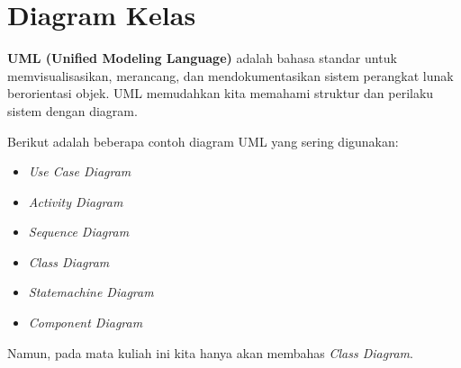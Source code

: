 \documentclass{../praktikum-ppt}
\begin{document}
    \section{Diagram Kelas}
    \begin{frame}{\insertsection}
      \begin{definisi}
        \textbf{UML (Unified Modeling Language)} adalah bahasa standar untuk memvisualisasikan, merancang, dan mendokumentasikan sistem perangkat lunak berorientasi objek. UML memudahkan kita memahami struktur dan perilaku sistem dengan diagram.
      \end{definisi}
      Berikut adalah beberapa contoh diagram UML yang sering digunakan:
      \begin{multicols}{3}
        \begin{itemize}
          \item \textit{Use Case Diagram}
          \item \textit{Activity Diagram}
          \item \textit{Sequence Diagram}
          \item \textit{Class Diagram}
          \item \textit{Statemachine Diagram}
          \item \textit{Component Diagram}
        \end{itemize}
      \end{multicols}
      Namun, pada mata kuliah ini kita hanya akan membahas \textit{Class Diagram}.
    \end{frame}
\end{document}

